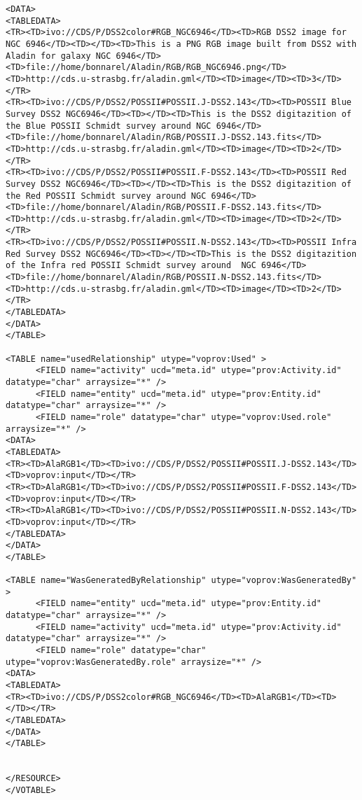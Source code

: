\begin{itemize}
\begin{verbatim}
<DATA>
<TABLEDATA>
<TR><TD>ivo://CDS/P/DSS2color#RGB_NGC6946</TD><TD>RGB DSS2 image for NGC 6946</TD><TD></TD><TD>This is a PNG RGB image built from DSS2 with Aladin for galaxy NGC 6946</TD><TD>file://home/bonnarel/Aladin/RGB/RGB_NGC6946.png</TD><TD>http://cds.u-strasbg.fr/aladin.gml</TD><TD>image</TD><TD>3</TD></TR>
<TR><TD>ivo://CDS/P/DSS2/POSSII#POSSII.J-DSS2.143</TD><TD>POSSII Blue Survey DSS2 NGC6946</TD><TD></TD><TD>This is the DSS2 digitazition of the Blue POSSII Schmidt survey around NGC 6946</TD><TD>file://home/bonnarel/Aladin/RGB/POSSII.J-DSS2.143.fits</TD><TD>http://cds.u-strasbg.fr/aladin.gml</TD><TD>image</TD><TD>2</TD></TR>
<TR><TD>ivo://CDS/P/DSS2/POSSII#POSSII.F-DSS2.143</TD><TD>POSSII Red Survey DSS2 NGC6946</TD><TD></TD><TD>This is the DSS2 digitazition of the Red POSSII Schmidt survey around NGC 6946</TD><TD>file://home/bonnarel/Aladin/RGB/POSSII.F-DSS2.143.fits</TD><TD>http://cds.u-strasbg.fr/aladin.gml</TD><TD>image</TD><TD>2</TD></TR>
<TR><TD>ivo://CDS/P/DSS2/POSSII#POSSII.N-DSS2.143</TD><TD>POSSII Infra Red Survey DSS2 NGC6946</TD><TD></TD><TD>This is the DSS2 digitazition of the Infra red POSSII Schmidt survey around  NGC 6946</TD><TD>file://home/bonnarel/Aladin/RGB/POSSII.N-DSS2.143.fits</TD><TD>http://cds.u-strasbg.fr/aladin.gml</TD><TD>image</TD><TD>2</TD></TR>
</TABLEDATA>
</DATA>
</TABLE>

<TABLE name="usedRelationship" utype="voprov:Used" >
      <FIELD name="activity" ucd="meta.id" utype="prov:Activity.id" datatype="char" arraysize="*" />
      <FIELD name="entity" ucd="meta.id" utype="prov:Entity.id" datatype="char" arraysize="*" />
      <FIELD name="role" datatype="char" utype="voprov:Used.role" arraysize="*" />
<DATA>
<TABLEDATA>
<TR><TD>AlaRGB1</TD><TD>ivo://CDS/P/DSS2/POSSII#POSSII.J-DSS2.143</TD><TD>voprov:input</TD></TR>
<TR><TD>AlaRGB1</TD><TD>ivo://CDS/P/DSS2/POSSII#POSSII.F-DSS2.143</TD><TD>voprov:input</TD></TR>
<TR><TD>AlaRGB1</TD><TD>ivo://CDS/P/DSS2/POSSII#POSSII.N-DSS2.143</TD><TD>voprov:input</TD></TR>
</TABLEDATA>
</DATA>
</TABLE>

<TABLE name="WasGeneratedByRelationship" utype="voprov:WasGeneratedBy" >
      <FIELD name="entity" ucd="meta.id" utype="prov:Entity.id" datatype="char" arraysize="*" />
      <FIELD name="activity" ucd="meta.id" utype="prov:Activity.id"  datatype="char" arraysize="*" />
      <FIELD name="role" datatype="char" utype="voprov:WasGeneratedBy.role" arraysize="*" />
<DATA>
<TABLEDATA>
<TR><TD>ivo://CDS/P/DSS2color#RGB_NGC6946</TD><TD>AlaRGB1</TD><TD></TD></TR>
</TABLEDATA>
</DATA>
</TABLE>


</RESOURCE>
</VOTABLE>

\end{verbatim}
  
  
\end{itemize}

